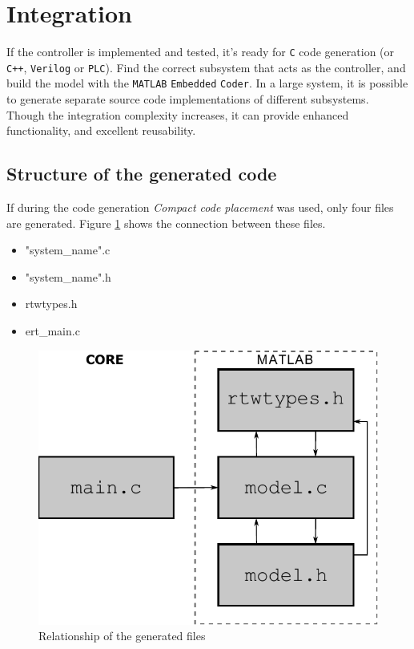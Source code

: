 \section{Integration}
\label{sec:integration}

If the controller is implemented and tested, it's ready for \verb!C! code generation (or \verb!C++!, \verb!Verilog! or \verb!PLC!). Find the correct subsystem that acts as the controller, and build the model with the \verb!MATLAB! \texttt{Embedded} \verb!Coder!. In a large system, it is possible to generate separate source code implementations of different subsystems. Though the integration complexity increases, it can provide enhanced functionality, and excellent reusability.

\subsection{Structure of the generated code}

If during the code generation \emph{Compact code placement} was used, only four files are generated. Figure \ref{fig:rtw} shows the connection between these files. 

\begin{minipage}{0.45\linewidth}
	\begin{itemize}
		\item "system\_name".c
		\item "system\_name".h
		\item rtwtypes.h
		\item ert\_main.c
	\end{itemize}
\end{minipage}
\begin{minipage}{0.45\linewidth}
	\begin{figure}[H]
		\centering
		\includegraphics[width=0.8\linewidth]{img/rtw}
		\caption{Relationship of the generated files}
		\label{fig:rtw}
		\vspace{10pt}
	\end{figure}
\end{minipage}



